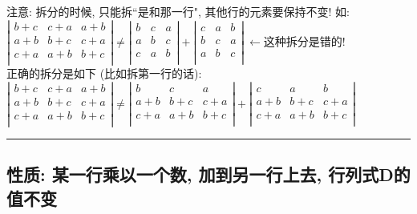 \documentclass[UTF8]{ctexart}
\begin{document}
	注意: 拆分的时候, 只能拆``是和那一行", 其他行的元素要保持不变! 如:\\	
	$
	\left| \begin{matrix}
		b+c&		c+a&		a+b\\
		a+b&		b+c&		c+a\\
		c+a&		a+b&		b+c\\
	\end{matrix} \right|\ne \left| \begin{matrix}
		b&		c&		a\\
		a&		b&		c\\
		c&		a&		b\\
	\end{matrix} \right|+\left| \begin{matrix}
		c&		a&		b\\
		b&		c&		a\\
		a&		b&		c\\
	\end{matrix} \right|\ ←\text{这种拆分是错的!}
	$\\
	
	
	正确的拆分是如下 (比如拆第一行的话): \\	
	$
	\left| \begin{matrix}
		b+c&		c+a&		a+b\\
		a+b&		b+c&		c+a\\
		c+a&		a+b&		b+c\\
	\end{matrix} \right|\ne \left| \begin{matrix}
		b&		c&		a\\
		a+b&		b+c&		c+a\\
		c+a&		a+b&		b+c\\
	\end{matrix} \right|+\left| \begin{matrix}
		c&		a&		b\\
		a+b&		b+c&		c+a\\
		c+a&		a+b&		b+c\\
	\end{matrix} \right|
	$ \\
	
	\hrule
	
	\subsection{  性质:  某一行乘以一个数, 加到另一行上去, 行列式D的值不变}
	
\end{document}
